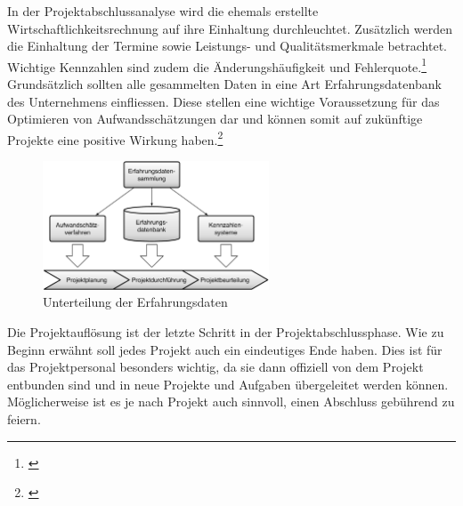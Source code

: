In der Projektabschlussanalyse wird die ehemals erstellte Wirtschaftlichkeitsrechnung
auf ihre Einhaltung durchleuchtet. Zusätzlich werden die Einhaltung der Termine sowie
Leistungs- und Qualitätsmerkmale betrachtet. Wichtige Kennzahlen sind zudem
die Änderungshäufigkeit und Fehlerquote.\footnote{\citealp*[Vgl.][S. 265]{schelle2007projekte}}
Grundsätzlich sollten alle gesammelten Daten in eine Art Erfahrungsdatenbank 
des Unternehmens einfliessen. Diese stellen eine wichtige Voraussetzung für das 
Optimieren von Aufwandsschätzungen dar und können somit auf zukünftige Projekte 
eine positive Wirkung haben.\footnote{\citealp*[Vgl.][S. 275]{burghardt2007einfuehrung}}

\begin{figure}[htbp]
\begin{center}
\includegraphics[width=0.6\textwidth,angle=0]{./bilder/theorie/04_unterteilung_erfahrungsdaten.pdf}
\caption{Unterteilung der Erfahrungsdaten}
\label{pic:04_unterteilung_erfahrungsdaten}
\end{center}
\end{figure}

Die Projektauflösung ist der letzte Schritt in der Projektabschlussphase. Wie 
zu Beginn erwähnt soll jedes Projekt auch ein eindeutiges Ende haben. Dies ist
für das Projektpersonal besonders wichtig, da sie dann offiziell von dem
Projekt entbunden sind und in neue Projekte und Aufgaben übergeleitet werden
können. Möglicherweise ist es je nach Projekt auch sinnvoll, einen Abschluss
gebührend zu feiern.